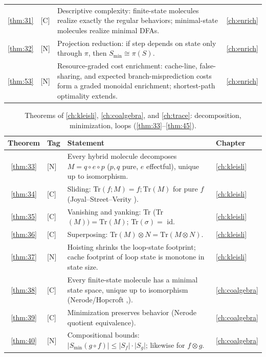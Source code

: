 \begin{table}[!htbp]
\begin{tabular}{@{}clp{7.2cm}l@{}}
\ref{thm:31} & [C] & Descriptive complexity: finite-state molecules realize exactly the regular behaviors; minimal-state molecules realize minimal DFAs. & \autoref{ch:enrich}\\
\ref{thm:32} & [N] & Projection reduction: if step depends on state only through $\pi$, then $S_{\min} \cong \pi (S)$. & \autoref{ch:enrich}\\
\ref{thm:53} & [N] & Resource-graded cost enrichment: cache-line, false-sharing, and expected branch-misprediction costs form a graded monoidal enrichment; shortest-path optimality extends. & \autoref{ch:enrich}\\
\bottomrule
\end{tabular}
\end{table}

\begin{table}[!htbp]
\centering
\caption{Theorems of \autoref{ch:kleisli}, \autoref{ch:coalgebra}, and \autoref{ch:trace}: decomposition, minimization, loops (\autoref{thm:33}--\autoref{thm:45}).}
\label{tab:thm-kleisli-coalg-trace}
\small
\begin{tabular}{@{}clp{7.2cm}l@{}}
\toprule
Theorem & Tag & Statement & Chapter\\
\midrule
\ref{thm:33} & [N] & Every hybrid molecule decomposes $M = q \circ e \circ p$ ($p,q$ pure, $e$ effectful), unique up to isomorphism. & \autoref{ch:kleisli}\\
\ref{thm:34} & [C] & Sliding: Tr$(f;M) = f;\mathrm{Tr} (M)$ for pure $f$ (Joyal--Street--Verity \cite{joyalsv}). & \autoref{ch:kleisli}\\
\ref{thm:35} & [C] & Vanishing and yanking: Tr (Tr$(M)) = \mathrm{Tr} (M)$; Tr$(\sigma) = $ id. & \autoref{ch:kleisli}\\
\ref{thm:36} & [C] & Superposing: Tr$(M)\otimes N = \mathrm{Tr} (M\otimes N)$. & \autoref{ch:kleisli}\\
\ref{thm:37} & [N] & Hoisting shrinks the loop-state footprint; cache footprint of loop state is monotone in state size. & \autoref{ch:kleisli}\\
\ref{thm:38} & [C] & Every finite-state molecule has a minimal state space, unique up to isomorphism (Nerode/Hopcroft \cite{nerode},\cite{hopcroft}). & \autoref{ch:coalgebra}\\
\ref{thm:39} & [C] & Minimization preserves behavior (Nerode quotient equivalence). & \autoref{ch:coalgebra}\\
\ref{thm:40} & [N] & Compositional bounds: $\lvert S_{\min} (g\circ f)\rvert \le \lvert S_f\rvert\cdot\lvert S_g\rvert$; likewise for $f\otimes g$. & \autoref{ch:coalgebra}\\

\end{tabular}
\end{table}
